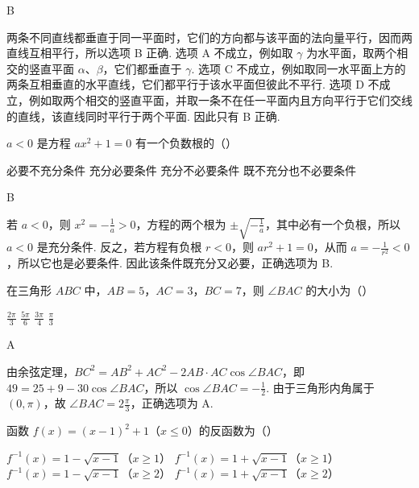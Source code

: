 \begin{answer}
B
\end{answer}

\begin{solution}
两条不同直线都垂直于同一平面时，它们的方向都与该平面的法向量平行，因而两直线互相平行，所以选项 B 正确. 选项 A 不成立，例如取 \(\gamma\) 为水平面，取两个相交的竖直平面 \(\alpha\)、\(\beta\)，它们都垂直于 \(\gamma\). 选项 C 不成立，例如取同一水平面上方的两条互相垂直的水平直线，它们都平行于该水平面但彼此不平行. 选项 D 不成立，例如取两个相交的竖直平面，并取一条不在任一平面内且方向平行于它们交线的直线，该直线同时平行于两个平面. 因此只有 B 正确.
\end{solution}

\begin{problem}
\(a < 0\) 是方程 \(ax^2 + 1 = 0\) 有一个负数根的（\quad）

\choices
    {必要不充分条件}
    {充分必要条件}
    {充分不必要条件}
    {既不充分也不必要条件}
\end{problem}

\begin{answer}
B
\end{answer}

\begin{solution}
若 \(a<0\)，则 \(x^2=-\frac{1}{a}>0\)，方程的两个根为 \(\pm\sqrt{-\frac{1}{a}}\)，其中必有一个负根，所以 \(a<0\) 是充分条件. 反之，若方程有负根 \(r<0\)，则 \(ar^2+1=0\)，从而 \(a=-\frac{1}{r^2}<0\)，所以它也是必要条件. 因此该条件既充分又必要，正确选项为 B.
\end{solution}

\begin{problem}
在三角形 \(ABC\) 中，\(AB = 5\)，\(AC = 3\)，\(BC = 7\)，则 \(\angle BAC\) 的大小为（\quad）

\choices
    {\(\frac{2\pi}{3}\)}
    {\(\frac{5\pi}{6}\)}
    {\(\frac{3\pi}{4}\)}
    {\(\frac{\pi}{3}\)}
\end{problem}

\begin{answer}
A
\end{answer}

\begin{solution}
由余弦定理，\(BC^2=AB^2+AC^2-2AB\cdot AC\cos\angle BAC\)，即 \(49=25+9-30\cos\angle BAC\)，所以 \(\cos\angle BAC=-\frac{1}{2}\). 由于三角形内角属于 \((0,\pi)\)，故 \(\angle BAC=2\frac{\pi}{3}\)，正确选项为 A.
\end{solution}

\begin{problem}
函数 \(f(x) = (x - 1)^2 + 1\)（\(x \leqslant 0\)）的反函数为（\quad）

\choices
    {\(f^{-1}(x) = 1 - \sqrt{x - 1}\)（\(x \geqslant 1\)）}
    {\(f^{-1}(x) = 1 + \sqrt{x - 1}\)（\(x \geqslant 1\)）}
    {\(f^{-1}(x) = 1 - \sqrt{x - 1}\)（\(x \geqslant 2\)）}
    {\(f^{-1}(x) = 1 + \sqrt{x - 1}\)（\(x \geqslant 2\)）}
\end{problem}

